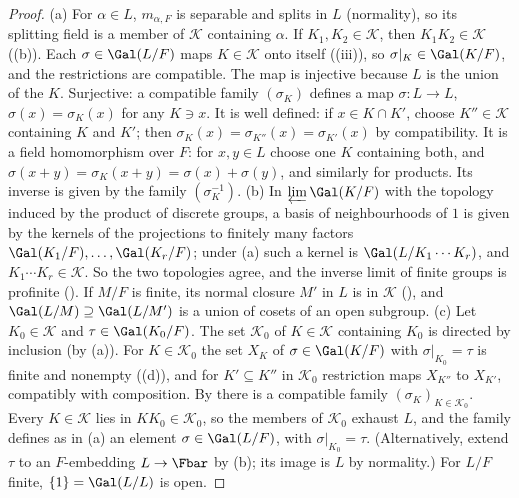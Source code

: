 \begin{proof}
(a) For $\alpha\in L$, $m_{\alpha,F}$ is separable and splits in $L$ (normality), so its splitting field is a member of $\mathcal{K}$ containing $\alpha$. If
$K_1,K_2\in\mathcal{K}$, then $K_1K_2\in\mathcal{K}$ ((b)). Each $\sigma\in\Gal(L/F)$ maps $K\in\mathcal{K}$ onto itself
((iii)), so $\sigma|_K\in\Gal(K/F)$, and the restrictions are compatible. The map is injective because $L$ is the union of the $K$.
Surjective: a compatible family $(\sigma_K)$ defines a map $\sigma\colon L\to L$, $\sigma(x)=\sigma_K(x)$ for any $K\ni x$. It is well defined: if $x\in K\cap K'$,
choose $K''\in\mathcal{K}$ containing $K$ and $K'$; then $\sigma_K(x)=\sigma_{K''}(x)=\sigma_{K'}(x)$ by compatibility. It is a field homomorphism over $F$: for
$x,y\in L$ choose one $K$ containing both, and $\sigma(x+y)=\sigma_K(x+y)=\sigma(x)+\sigma(y)$, and similarly for products. Its inverse is given by the family
$(\sigma_K^{-1})$.
(b) In $\varprojlim\Gal(K/F)$ with the topology induced by the product of discrete groups, a basis of neighbourhoods of $1$ is given by the kernels of the
projections to finitely many factors $\Gal(K_1/F),\dots,\Gal(K_r/F)$; under (a) such a kernel is $\Gal(L/K_1\cdots K_r)$, and $K_1\cdots K_r\in\mathcal{K}$. So the
two topologies agree, and the inverse limit of finite groups is profinite (). If $M/F$ is finite, its normal closure $M'$ in $L$ is in $\mathcal{K}$
(), and $\Gal(L/M)\supseteq\Gal(L/M')$ is a union of cosets of an open subgroup.
(c) Let $K_0\in\mathcal{K}$ and $\tau\in\Gal(K_0/F)$. The set $\mathcal{K}_0$ of $K\in\mathcal{K}$ containing $K_0$ is directed by inclusion (by (a)). For $K\in\mathcal{K}_0$ the
set $X_K$ of $\sigma\in\Gal(K/F)$ with $\sigma|_{K_0}=\tau$ is finite and nonempty ((d)), and for $K'\subseteq K''$ in $\mathcal{K}_0$ restriction
maps $X_{K''}$ to $X_{K'}$, compatibly with composition. By  there is a compatible family $(\sigma_K)_{K\in\mathcal{K}_0}$. Every $K\in\mathcal{K}$
lies in $KK_0\in\mathcal{K}_0$, so the members of $\mathcal{K}_0$ exhaust $L$, and the family defines as in (a) an element $\sigma\in\Gal(L/F)$, with $\sigma|_{K_0}=\tau$. (Alternatively,
extend $\tau$ to an $F$-embedding $L\to\Fbar$ by (b); its image is $L$ by normality.) For $L/F$ finite, $\{1\}=\Gal(L/L)$ is open.
\end{proof}

